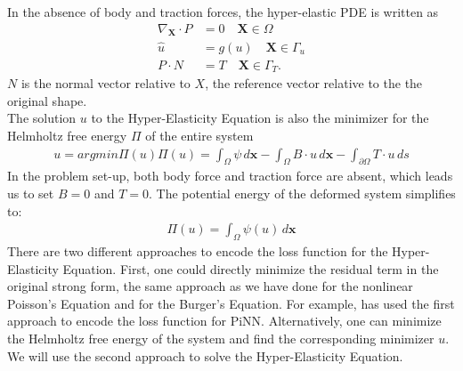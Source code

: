 In the absence of body and traction forces, the hyper-elastic PDE is written as
\begin{align*}
    \nabla_{\mathbf{X}} \cdot P &= 0 \quad \mathbf{X} \in \Omega \\
    \hat{u} &= g(u) \quad \mathbf{X} \in \Gamma_u \\
    P \cdot N &= T \quad \mathbf{X} \in \Gamma_T. 
\end{align*}
$N$ is the normal vector relative to $X$, the reference vector relative to the the original shape. \\
The solution $u$ to the Hyper-Elasticity Equation is also the minimizer for the Helmholtz free energy $\Pi$ of the entire system
 \begin{align*}
    u = argmin \Pi(u)
    \Pi(u) = \int_{\Omega} \psi \, d\bm{x} -\int_{\Omega} B \cdot u \, d\bm{x} -\int_{\partial \Omega} T \cdot u \, ds
\end{align*}
In the problem set-up, both body force and traction force are absent, which leads us to set $B = 0 $ and $T = 0$. The potential energy of the deformed system simplifies to: 
\begin{align*}
    \Pi(u) = \int_{\Omega} \psi(u) \, d\bm{x}
\end{align*}
There are two different approaches to encode the loss function for the Hyper-Elasticity Equation. First, one could directly minimize the residual term in the original strong form, the same approach as we have done for the nonlinear Poisson's Equation and for the Burger's Equation. For example, \citep{abueidda2021meshless} has used the first approach to encode the loss function for PiNN. Alternatively, one can minimize the Helmholtz free energy of the system and find the corresponding minimizer $u$. We will use the second approach to solve the Hyper-Elasticity Equation. 

